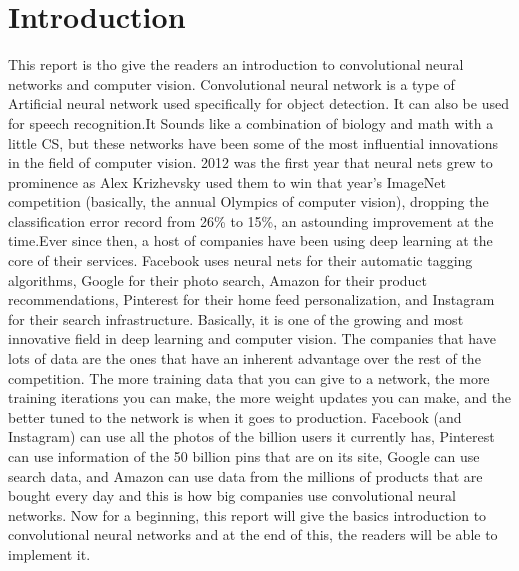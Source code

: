 \documentclass[12pt]{article}
\begin{document}
\section{\fontsize{14}{14}\selectfont Introduction}
 \par This report is tho give the readers an introduction to convolutional neural networks and computer vision.  Convolutional neural network is a type of Artificial neural network used specifically for object detection. It can also be used for speech recognition.It Sounds like a combination of biology and math with a little CS, but these networks have been some of the most influential innovations in the field of computer vision. 2012 was the first year that neural nets grew to prominence as Alex Krizhevsky used them to win that year’s ImageNet competition (basically, the annual Olympics of computer vision), dropping the classification error record from 26\% to 15\%, an astounding improvement at the time.Ever since then, a host of companies have been using deep learning at the core of their services. Facebook uses neural nets for their automatic tagging algorithms, Google for their photo search, Amazon for their product recommendations, Pinterest for their home feed personalization, and Instagram for their search infrastructure. Basically, it is one of the growing and most innovative field in deep learning and computer vision. The companies that have lots of data are the ones that have an inherent advantage over the rest of the competition. The more training data that you can give to a network, the more training iterations you can make, the more weight updates you can make, and the better tuned to the network is when it goes to production. Facebook (and Instagram) can use all the photos of the billion users it currently has, Pinterest can use information of the 50 billion pins that are on its site, Google can use search data, and Amazon can use data from the millions of products that are bought every day and this is how big companies use convolutional neural networks. Now for a beginning, this report will give the basics introduction to convolutional neural networks and at the end of this, the readers will be able to implement it.
\end{document}
